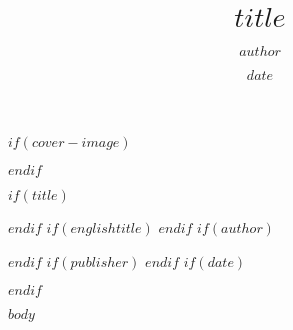 \documentclass[$if(fontsize)$$fontsize$,$endif$$if(lang)$$babel-lang$,$endif$$if(papersize)$$papersize$paper,$endif$$for(classoption)$$classoption$$sep$,$endfor$]{$documentclass$}
\theoremstyle{plain}
\theoremstyle{definition}
\theoremstyle{remark}
\theoremstyle{ocrenumbox}
\theoremstyle{plain}
\begin{document}
$if(cover-image)$
  \cleardoublepage
  \thispagestyle{empty}
  \begin{center}
  \end{center}
  \cleardoublepage
$endif$


\let\oldincludegraphics\includegraphics
\renewcommand\includegraphics[2][]{%
\begin{adjustbox}{max size={\textwidth}{\textheight}}
\oldincludegraphics[#1]{#2}
\end{adjustbox}
}

$if(title)$
\title{$title$}
$endif$
$if(englishtitle)$
$endif$
$if(author)$
\author{$author$}
$endif$
$if(publisher)$
$endif$
$if(date)$
\date{$date$}
$endif$
\maketitle
\makeDeclareAuthorization

$body$

\backmatter	%

\printindex

\printbibliography[heading=bibintoc]
\end{document}
